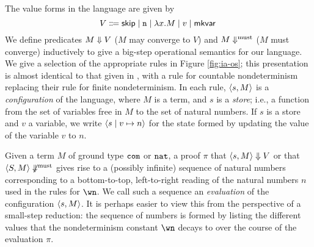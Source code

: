 \documentclass[sigplan,10pt,review]{acmart}\settopmatter{printfolios=true,printccs=false,printacmref=false}
\begin{document}
The value forms in the language are given by
\[
  V \Coloneqq {\mathsf{skip}} \mid {\mathtt{n}} \mid \lambda x.M \mid v \mid {\mathsf{mkvar}\;}
  \]
We define predicates $M \Downarrow V$ ($M$ may converge to $V$) and $M\Downarrow^{\text{must}}$ ($M$ must converge) inductively to give a big-step operational semantics for our language.  
We give a selection of the appropriate rules in Figure \ref{fig:ia-os}; this presentation is almost identical to that given in \cite{mcCHFiniteND}, with a rule for countable nondeterminism replacing their rule for finite nondeterminism.  
In each rule, $\langle s , M \rangle$ is a \emph{configuration} of the language, where $M$ is a term, and $s$ is a \emph{store}; i.e., a function from the set of variables free in $M$ to the set of natural numbers.  
If $s$ is a store and $v$ a variable, we write $\langle s \mid v \mapsto n \rangle$ for the state formed by updating the value of the variable $v$ to $n$.

\begin{figure*}
  \caption{Operational semantics of Idealized Algol with Countable Nondeterminism}
  \label{fig:ia-os}
\end{figure*}

Given a term $M$ of ground type ${\mathtt{com}}$ or ${\mathtt{nat}}$, a proof $\pi$ that $\langle s , M \rangle\Downarrow V$ or that $\langle S , M \rangle \not\Downarrow^{\text{must}}$ gives rise to a (possibly infinite) sequence of natural numbers corresponding to a bottom-to-top, left-to-right reading of the natural numbers $n$ used in the rules for $\wn$.  
We call such a sequence an \emph{evaluation} of the configuration $\langle s , M \rangle$.  
It is perhaps easier to view this from the perspective of a small-step reduction: the sequence of numbers is formed by listing the different values that the nondeterminism constant $\wn$ decays to over the course of the evaluation $\pi$.  
\end{document}

